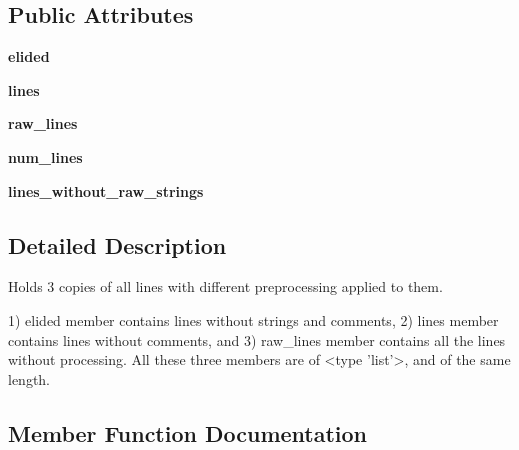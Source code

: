 \subsection*{Public Attributes}
\begin{DoxyCompactItemize}
\item 
\mbox{\label{classcpp__lint_1_1_cleansed_lines_a64e4e7fef00ccfa581616b8b85592dd7}} 
{\bfseries elided}
\item 
\mbox{\label{classcpp__lint_1_1_cleansed_lines_aa19105096e36f248aa58671ecec69dfd}} 
{\bfseries lines}
\item 
\mbox{\label{classcpp__lint_1_1_cleansed_lines_ade08ee2f3fafcc069cbe667e2e7c0d43}} 
{\bfseries raw\+\_\+lines}
\item 
\mbox{\label{classcpp__lint_1_1_cleansed_lines_a2f1661e7b3397b9ef6d7ad26317a0368}} 
{\bfseries num\+\_\+lines}
\item 
\mbox{\label{classcpp__lint_1_1_cleansed_lines_a8b90902e345dab36cbc00ba8980bf914}} 
{\bfseries lines\+\_\+without\+\_\+raw\+\_\+strings}
\end{DoxyCompactItemize}


\subsection{Detailed Description}
\begin{DoxyVerb}Holds 3 copies of all lines with different preprocessing applied to them.

1) elided member contains lines without strings and comments,
2) lines member contains lines without comments, and
3) raw_lines member contains all the lines without processing.
All these three members are of <type 'list'>, and of the same length.
\end{DoxyVerb}
 

\subsection{Member Function Documentation}
\mbox{\label{classcpp__lint_1_1_cleansed_lines_a52145364f0dac8c4aa2c0b807abb44ee}} 

